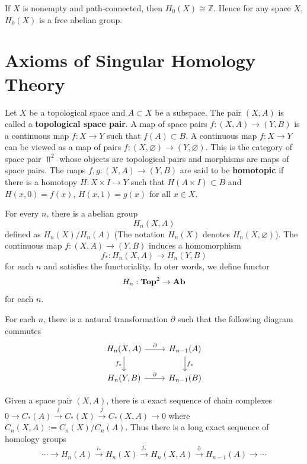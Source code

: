 \documentclass[12pt, oneside]{book}
\begin{document}
\begin{proposition}
    If $X$ is nonempty and path-connected, then $H_0(X) \cong \mathbb{Z}$.
    Hence for any space $X$, $H_0(X)$ is a free abelian group.
\end{proposition}



\section{Axioms of Singular Homology Theory}
Let $X$ be a topological space and $A \subset X$ be a subspace. The pair $(X,A)$ is called a \textbf{topological space pair}. A map of space pairs $f: (X,A) \to (Y,B)$ is a continuous map $f: X \to Y$ such that $f(A) \subset B$.
A continuous map $f:X \to Y$ can be viewed as a map of pairs $f: (X,\varnothing) \to (Y,\varnothing)$.
This is the category of space pair $\Top^2$ whose objects are topological pairs and morphisms are maps of space pairs.
The maps $f,g: (X,A) \to (Y,B)$ are said to be \textbf{homotopic} if there is a homotopy $H: X \times I \to Y$ such that $H(A \times I) \subset B$ and $H(x,0) = f(x)$, $H(x,1) = g(x)$ for all $x \in X$.


For every $n$, there is a abelian group
\begin{equation*}
    H_n(X,A)
\end{equation*}
defined as $H_n(X)/H_n(A)$ (The notation $H_n(X)$ denotes $H_n(X,\varnothing)$).
The continuous map $f: (X,A) \to (Y,B)$ induces a homomorphism \begin{equation*}
    f_*: H_n(X,A) \to H_n(Y,B)
\end{equation*}
for each $n$ and satisfies the functoriality.
In oter words, we define functor
\begin{equation*}
    H_n: \mathbf{Top}^2 \to \mathbf{Ab}
\end{equation*}
for each $n$.


For each $n$, there is a natural transformation $\partial$ such that the following diagram commutes
\begin{equation*}
    \begin{tikzcd}
        H_n(X,A) \arrow[r,"\partial"] \arrow[d,"f_*"'] & H_{n-1}(A) \arrow[d,"f_*"]\\
        H_n(Y,B) \arrow[r,"\partial"] & H_{n-1}(B)
    \end{tikzcd}
\end{equation*}



\begin{theorem}
    Given a space pair $(X,A)$, there is a exact sequence of chain complexes
    $0 \to C_*(A) \xrightarrow{i} C_*(X) \xrightarrow{j} C_*(X,A) \to 0$
    where $C_n(X,A):= C_n(X)/C_n(A)$.
    Thus there is a long exact sequence of homology groups
    \begin{equation*}
        \cdots \to H_n(A) \xrightarrow{i_*} H_n(X) \xrightarrow{j_*} H_n(X,A) \xrightarrow{\partial} H_{n-1}(A) \to \cdots
    \end{equation*}
\end{theorem}
\end{document}
